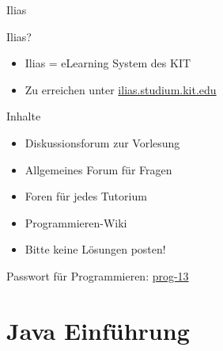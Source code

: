 \documentclass[18pt]{beamer}
\begin{document}
\begin{frame}{Ilias}
	\begin{block}{Ilias?}
	\begin{itemize}
		\item Ilias = eLearning System des KIT
		\item Zu erreichen unter \url{ilias.studium.kit.edu}
	\end{itemize}
	\end{block}
	\pause
	\begin{block}{Inhalte}
	\begin{itemize}
		\item Diskussionsforum zur Vorlesung
		\item Allgemeines Forum für Fragen
		\item Foren für jedes Tutorium
		\item Programmieren-Wiki
		\item \textcolor[rgb]{1,0,0}{Bitte keine Lösungen posten!}
	\end{itemize}
	\end{block}
	Passwort für Programmieren: \hspace{1cm} \url{prog-13}
\end{frame}

\section{Java Einführung}
\begin{frame}
\end{frame}

\appendix
\beginbackup


\backupend
\end{document}
